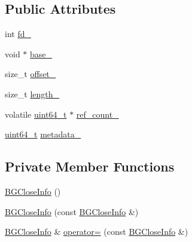 \subsection*{Public Attributes}
\begin{DoxyCompactItemize}
\item 
int \hyperlink{classleveldb_1_1anonymous__namespace_02env__posix_8cc_03_1_1_b_g_close_info_aa0dff4e7df720114fe3d23272a94f8d2}{fd\+\_\+}
\item 
void $\ast$ \hyperlink{classleveldb_1_1anonymous__namespace_02env__posix_8cc_03_1_1_b_g_close_info_a70d8e1f8f23a2e44b2f06517add80752}{base\+\_\+}
\item 
size\+\_\+t \hyperlink{classleveldb_1_1anonymous__namespace_02env__posix_8cc_03_1_1_b_g_close_info_a0a7b348e33e44bb2a891d7f60a15d819}{offset\+\_\+}
\item 
size\+\_\+t \hyperlink{classleveldb_1_1anonymous__namespace_02env__posix_8cc_03_1_1_b_g_close_info_a0c86dd1877f30733175d493f36ea1ace}{length\+\_\+}
\item 
volatile \hyperlink{stdint_8h_aaa5d1cd013383c889537491c3cfd9aad}{uint64\+\_\+t} $\ast$ \hyperlink{classleveldb_1_1anonymous__namespace_02env__posix_8cc_03_1_1_b_g_close_info_a1eb11395e6609f849369b1fae4d31b55}{ref\+\_\+count\+\_\+}
\item 
\hyperlink{stdint_8h_aaa5d1cd013383c889537491c3cfd9aad}{uint64\+\_\+t} \hyperlink{classleveldb_1_1anonymous__namespace_02env__posix_8cc_03_1_1_b_g_close_info_a244b45186bf98abfc895d1d7ad95c56a}{metadata\+\_\+}
\end{DoxyCompactItemize}
\subsection*{Private Member Functions}
\begin{DoxyCompactItemize}
\item 
\hyperlink{classleveldb_1_1anonymous__namespace_02env__posix_8cc_03_1_1_b_g_close_info_af1eade23bc6db1619ae809f3063fa54d}{B\+G\+Close\+Info} ()
\item 
\hyperlink{classleveldb_1_1anonymous__namespace_02env__posix_8cc_03_1_1_b_g_close_info_a9f426f9e468d8b83fbd305d6aa1700a8}{B\+G\+Close\+Info} (const \hyperlink{classleveldb_1_1anonymous__namespace_02env__posix_8cc_03_1_1_b_g_close_info}{B\+G\+Close\+Info} \&)
\item 
\hyperlink{classleveldb_1_1anonymous__namespace_02env__posix_8cc_03_1_1_b_g_close_info}{B\+G\+Close\+Info} \& \hyperlink{classleveldb_1_1anonymous__namespace_02env__posix_8cc_03_1_1_b_g_close_info_a010a84988f9f3431fd778ea65f6e89ed}{operator=} (const \hyperlink{classleveldb_1_1anonymous__namespace_02env__posix_8cc_03_1_1_b_g_close_info}{B\+G\+Close\+Info} \&)
\end{DoxyCompactItemize}
